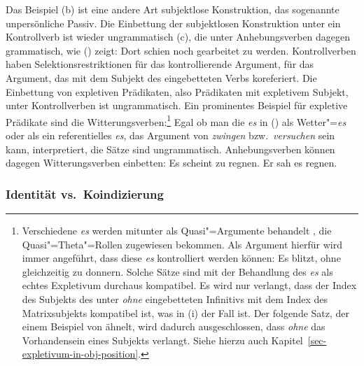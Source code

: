 \noindent
Das Beispiel (b) ist eine andere Art subjektlose Konstruktion, das sogenannte unpersönliche Passiv.
\eal
{}
\zl
Die Einbettung der subjektlosen Konstruktion unter ein Kontrollverb ist wieder ungrammatisch (c), die
unter Anhebungsverben dagegen grammatisch, wie () zeigt:
\ea
Dort schien noch gearbeitet zu werden.
\z
Kontrollverben haben Selektionsrestriktionen für das kontrollierende Argument, \dash für das Argument,
das mit dem Subjekt des eingebetteten Verbs koreferiert. Die Einbettung von expletiven Prädikaten,
also Prädikaten mit expletivem Subjekt, unter Kontrollverben ist ungrammatisch. Ein prominentes
Beispiel für expletive Prädikate sind die Witterungsverben:\footnote{
        Verschiedene \emph{es} werden mitunter als Quasi"=Argumente behandelt \citep[]{Chomsky93a},
        die Quasi"=Theta"=Rollen zugewiesen bekommen.
        Als Argument hierfür wird immer angeführt, dass diese \emph{es} kontrolliert werden können:
        \ea
        Es blitzt, ohne gleichzeitig zu donnern.
        \z
        Solche Sätze sind mit der Behandlung des \emph{es} als echtes Expletivum durchaus
        kompatibel. Es wird nur verlangt, dass der Index des Subjekts des unter \emph{ohne} eingebetteten
        Infinitivs mit dem Index des Matrixsubjekts kompatibel ist, was in (i) der Fall ist.
        Der folgende Satz, der einem Beispiel von \citet[]{Fanselow91a} ähnelt,
        wird dadurch ausgeschlossen, dass \emph{ohne} das Vorhandensein eines Subjekts
        verlangt.
        \z
        Siehe hierzu auch Kapitel~\ref{sec-expletivum-in-obj-position}.%
}
\eal
{}
\zl
Egal ob man die \emph{es} in () als Wetter"=\emph{es} oder als ein referentielles \emph{es}, das
Argument von \emph{zwingen} bzw.\ \emph{versuchen} sein kann, interpretiert, die Sätze sind ungrammatisch.
Anhebungsverben können dagegen Witterungsverben einbetten:
\eal
\ex Es scheint zu regnen.
\ex Er sah es regnen.
\zl


\subsubsection{Identität vs.\ Koindizierung}
\label{sec-rais-contr-identity-coindexing}

